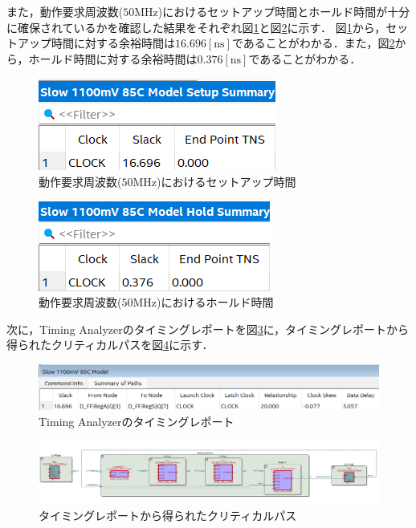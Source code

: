 \documentclass{jlreq}
\numberwithin{equation}{section}
\begin{document}
また，動作要求周波数($50\si{\MHz}$)におけるセットアップ時間とホールド時間が十分に確保されているかを確認した結果をそれぞれ図\ref{fig:setup_time}と図\ref{fig:hold_time}に示す．
図\ref{fig:setup_time}から，セットアップ時間に対する余裕時間は$16.696[\si{\ns}]$であることがわかる．また，図\ref{fig:hold_time}から，ホールド時間に対する余裕時間は$0.376[\si{\ns}]$であることがわかる．
\begin{figure}[H]
  \centering
  \includegraphics{assets/setup_summary.png}
  \caption{動作要求周波数($50\si{\MHz}$)におけるセットアップ時間}
  \label{fig:setup_time}
\end{figure}

\begin{figure}[H]
  \centering
  \includegraphics{assets/hold_summary.png}
  \caption{動作要求周波数($50\si{\MHz}$)におけるホールド時間}
  \label{fig:hold_time}
\end{figure}

次に，Timing Analyzerのタイミングレポートを図\ref{fig:timing_report}に，タイミングレポートから得られたクリティカルパスを図\ref{fig:critical_path}に示す．
\begin{figure}[H]
  \centering
  \includegraphics[width=\textwidth]{assets/critical_path_summary.png}
  \caption{Timing Analyzerのタイミングレポート}
  \label{fig:timing_report}
\end{figure}

\begin{figure}[H]
  \centering
  \includegraphics[width=\textwidth]{assets/timing_report_map_viewer.png}
  \caption{タイミングレポートから得られたクリティカルパス}
  \label{fig:critical_path}
\end{figure}
\end{document}
